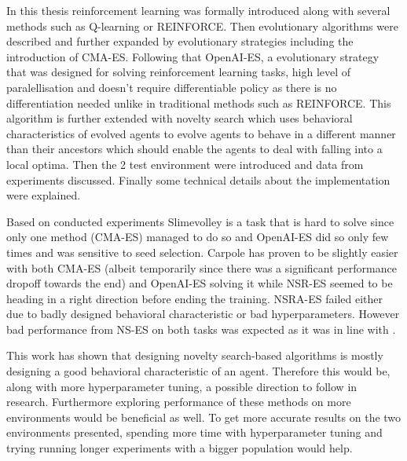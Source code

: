 

In this thesis reinforcement learning was formally introduced along with several methods such as Q-learning or REINFORCE. Then evolutionary algorithms were described and further expanded by evolutionary strategies including the introduction of CMA-ES. Following that OpenAI-ES, a evolutionary strategy that was designed for solving reinforcement learning tasks, high level of paralellisation and doesn't require differentiable policy as there is no differentiation needed unlike in traditional methods such as REINFORCE. This algorithm is further extended with novelty search which uses behavioral characteristics of evolved agents to evolve agents to behave in a different manner than their ancestors which should enable the agents to deal with falling into a local optima. Then the 2 test environment were introduced and data from experiments discussed. Finally some technical details about the implementation were explained.

Based on conducted experiments Slimevolley is a task that is hard to solve since only one method (CMA-ES) managed to do so and OpenAI-ES did so only few times and was sensitive to seed selection. Carpole has proven to be slightly easier with both CMA-ES (albeit temporarily since there was a significant performance dropoff towards the end) and OpenAI-ES solving it while NSR-ES seemed to be heading in a right direction before ending the training. NSRA-ES failed either due to badly designed behavioral characteristic or bad hyperparameters. However bad performance from NS-ES on both tasks was expected as it was in line with \cite{conti2018}.

This work has shown that designing novelty search-based algorithms is mostly designing a good behavioral characteristic of an agent. Therefore this would be, along with more hyperparameter tuning, a possible direction to follow in research. Furthermore exploring performance of these methods on more environments would be beneficial as well. To get more accurate results on the two environments presented, spending more time with hyperparameter tuning and trying running longer experiments with a bigger population would help.



